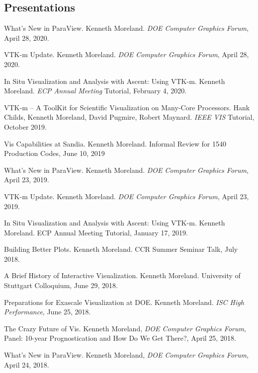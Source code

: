\documentclass{article}
\begin{document}


\subsection*{Presentations}

\begin{enumerate}[label={[\arabic*]}]
\item What's New in ParaView.
  Kenneth Moreland.
  \emph{DOE Computer Graphics Forum}, April 28, 2020.
\item VTK-m Update.
  Kenneth Moreland.
  \emph{DOE Computer Graphics Forum}, April 28, 2020.
\item In Situ Visualization and Analysis with Ascent: Using VTK-m.
  Kenneth Moreland.
  \emph{ECP Annual Meeting} Tutorial, February 4, 2020.
\item VTK-m -- A ToolKit for Scientific Visualization on Many-Core Processors.
  Hank Childs, Kenneth Moreland, David Pugmire, Robert Maynard.
  \emph{IEEE VIS} Tutorial, October 2019.
\item Vis Capabilities at Sandia.
  Kenneth Moreland.
  Informal Review for 1540 Production Codes, June 10, 2019
\item What's New in ParaView.
  Kenneth Moreland.
  \emph{DOE Computer Graphics Forum}, April 23, 2019.
\item VTK-m Update.
  Kenneth Moreland.
  \emph{DOE Computer Graphics Forum}, April 23, 2019.
\item In Situ Visualization and Analysis with Ascent: Using VTK-m.
  Kenneth Moreland.
  ECP Annual Meeting Tutorial, January 17, 2019.
\item Building Better Plots.
  Kenneth Moreland.
  CCR Summer Seminar Talk, July 2018.
\item A Brief History of Interactive Visualization.
  Kenneth Moreland.
  University of Stuttgart Colloquium, June 29, 2018.
\item Preparations for Exascale Visualization at DOE.
  Kenneth Moreland.
  \emph{ISC High Performance}, June 25, 2018.
\item The Crazy Future of Vis.
  Kenneth Moreland, \emph{DOE Computer Graphics Forum}, Panel: 10-year Prognostication and How Do We Get There?, April 25, 2018.
\item What's New in ParaView.
  Kenneth Moreland, \emph{DOE Computer Graphics Forum}, April 24, 2018.

\end{enumerate}
\end{document}
